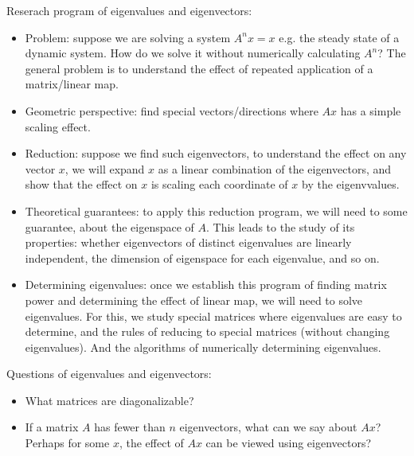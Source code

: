 \documentclass{report}
\begin{document}
Reserach program of eigenvalues and eigenvectors: 
\begin{itemize}
\item Problem: suppose we are solving a system $A^n x = x$ e.g. the steady state of a dynamic system. How do we solve it without numerically calculating $A^n$? The general problem is to understand the effect of repeated application of a matrix/linear map. 

\item Geometric perspective: find special vectors/directions where $Ax$ has a simple scaling effect. 

\item Reduction: suppose we find such eigenvectors, to understand the effect on any vector $x$, we will expand $x$ as a linear combination of the eigenvectors, and show that the effect on $x$ is scaling each coordinate of $x$ by the eigenvvalues. 

\item Theoretical guarantees: to apply this reduction program, we will need to some guarantee, about the eigenspace of $A$. This leads to the study of its properties: whether eigenvectors of distinct eigenvalues are linearly independent, the dimension of eigenspace for each eigenvalue, and so on. 

\item Determining eigenvalues: once we establish this program of finding matrix power and determining the effect of linear map, we will need to solve eigenvalues. For this, we study special matrices where eigenvalues are easy to determine, and the rules of reducing to special matrices (without changing eigenvalues). And the algorithms of numerically determining eigenvalues. 
\end{itemize}

Questions of eigenvalues and eigenvectors: 
\begin{itemize}
	\item What matrices are diagonalizable? 
	
	\item If a matrix $A$ has fewer than $n$ eigenvectors, what can we say about $Ax$? Perhaps for some $x$, the effect of $Ax$ can be viewed using eigenvectors? 
\end{itemize}
\end{document}
